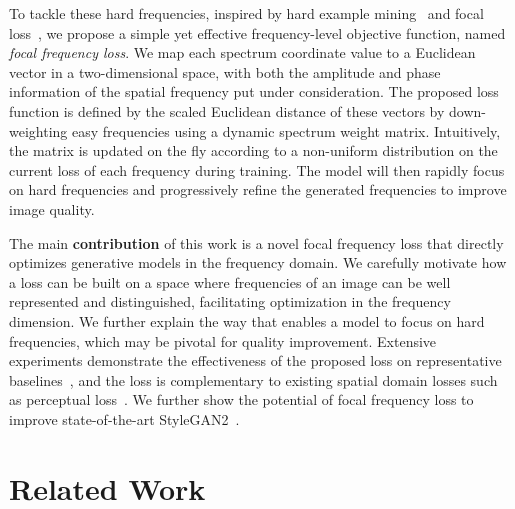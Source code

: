 \documentclass[10pt,twocolumn,letterpaper]{article}
\begin{document}
To tackle these hard frequencies, inspired by hard example mining~\cite{hempartmodel,ohem} and focal loss~\cite{focalloss}, we propose a simple yet effective frequency-level objective function, named \textit{focal frequency loss}.
We map each spectrum coordinate value to a Euclidean vector in a two-dimensional space, with both the amplitude and phase information of the spatial frequency put under consideration.
The proposed loss function is defined by the scaled Euclidean distance of these vectors by down-weighting easy frequencies using a dynamic spectrum weight matrix. Intuitively, the matrix is updated on the fly according to a non-uniform distribution on the current loss of each frequency during training.
The model will then rapidly focus on hard frequencies and progressively refine the generated frequencies to improve image quality.


The main \textbf{contribution} of this work is a novel focal frequency loss that directly optimizes generative models in the frequency domain. We carefully motivate how a loss can be built on a space where frequencies of an image can be well represented and distinguished, facilitating optimization in the frequency dimension. We further explain the way that enables a model to focus on hard frequencies, which may be pivotal for quality improvement.
Extensive experiments demonstrate the effectiveness of the proposed loss on representative baselines~\cite{ae,vae,pix2pix,SPADE}, and the loss is complementary to existing spatial domain losses such as perceptual loss~\cite{perceptualloss}.
We further show the potential of focal frequency loss to improve state-of-the-art StyleGAN2~\cite{stylegan2}.
 

\section{Related Work}
\label{sec:relatedwork}
\end{document}
